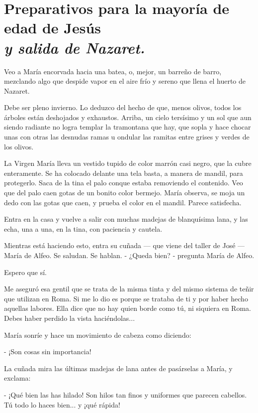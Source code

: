 \documentclass[12pt, twoside, openright]{book} %
\begin{document}
\chapter*{Preparativos para la mayoría de edad de Jesús \\ \normalfont\normalsize\textit{y salida de Nazaret.}}
  
Veo a María encorvada hacia una batea, o, mejor, un barreño de barro, mezclando algo que despide vapor en el aire frío y sereno que llena el huerto de Nazaret. 

Debe ser pleno invierno. Lo deduzco del hecho de que, menos olivos, todos los árboles están deshojados y exhaustos. Arriba, un cielo tersísimo y un sol que aun siendo radiante no logra templar la tramontana que hay, que sopla y hace chocar unas con otras las desnudas ramas u ondular las ramitas entre grises y verdes de los olivos. 

La Virgen María lleva un vestido tupido de color marrón casi negro, que la cubre enteramente. Se ha colocado delante una tela basta, a manera de mandil, para protegerlo. Saca de la tina el palo conque estaba removiendo el contenido. Veo que del palo caen gotas de un bonito color bermejo. María observa, se moja un dedo con las gotas que caen, y prueba el color en el mandil. Parece satisfecha. 

Entra en la casa y vuelve a salir con muchas madejas de blanquísima lana, y las echa, una a una, en la tina, con paciencia y cautela. 

Mientras está haciendo esto, entra su cuñada — que viene del taller de José — María de Alfeo. Se saludan. Se hablan. - ¿Queda bien? - pregunta María de Alfeo. 

Espero que sí. 

Me aseguró esa gentil que se trata de la misma tinta y del mismo sistema de teñir que utilizan en Roma. Si me lo dio es porque se trataba de ti y por haber hecho aquellas labores. Ella dice que no hay quien borde como tú, ni siquiera en Roma. Debes haber perdido la vista haciéndolas... 

María sonríe y hace un movimiento de cabeza como diciendo: 

- ¡Son cosas sin importancia! 

La cuñada mira las últimas madejas de lana antes de pasárselas a María, y exclama: 

- ¡Qué bien las has hilado! Son hilos tan finos y uniformes que parecen cabellos. Tú todo lo haces bien... y ¡qué rápida! 
\end{document}
